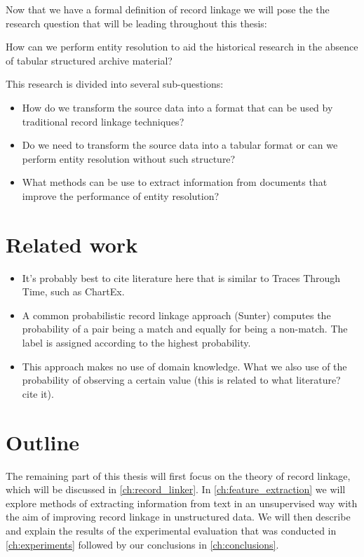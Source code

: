 Now that we have a formal definition of record linkage we will pose the the research question that will be leading throughout this thesis:

\begin{question*}
    How can we perform entity resolution to aid the historical research in the absence of tabular structured archive material?
\end{question*}

This research is divided into several sub-questions:

\begin{itemize}
    \item How do we transform the source data into a format that can be used by traditional record linkage techniques?
    \item Do we need to transform the source data into a tabular format or can we perform entity resolution without such structure?
    \item What methods can be use to extract information from documents that improve the performance of entity resolution?
\end{itemize}




\section{Related work}
\label{sec:related_work}

\begin{itemize}
    \item It's probably best to cite literature here that is similar to Traces Through Time, such as ChartEx.
    \item A common probabilistic record linkage approach (Sunter) computes the probability of a pair being a match and equally for being a non-match. The label is assigned according to the highest probability.
    \item This approach makes no use of domain knowledge. What we also use of the probability of observing a certain value (this is related to what literature? cite it).
\end{itemize}




\section{Outline}
\label{sec:outline}

The remaining part of this thesis will first focus on the theory of record linkage, which will be discussed in \cref{ch:record_linker}.
In \cref{ch:feature_extraction} we will explore methods of extracting information from text in an unsupervised way with the aim of improving record linkage in unstructured data.
We will then describe and explain the results of the experimental evaluation that was conducted in \cref{ch:experiments} followed by our conclusions in \cref{ch:conclusions}.